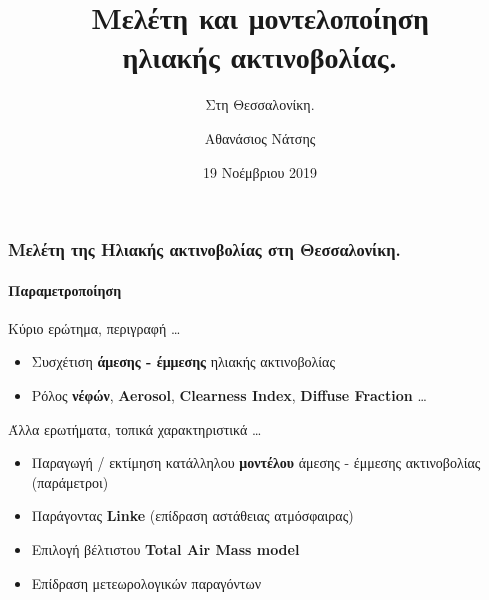 \documentclass[hyperref={pdfpagelabels=false}]{beamer}
\makeatletter
\newcommand\makebeamertitle{\frame{\maketitle}}%
\let\origtableofcontents=\tableofcontents
\def\tableofcontents{\@ifnextchar[{\origtableofcontents}{\gobbletableofcontents}}
\def\gobbletableofcontents#1{\origtableofcontents}
\def\myframeend{} %
\makeatother
\begin{document}


\title[Solar Iradiance]{Μελέτη και μοντελοποίηση\\ηλιακής ακτινοβολίας.}

\subtitle{Στη Θεσσαλονίκη.}
\author{Αθανάσιος Νάτσης}


\date[2019-11-19]{19 Νοέμβριου 2019}

\makebeamertitle

%

\begin{frame}%
\frametitle{Μελέτη της Ηλιακής ακτινοβολίας στη Θεσσαλονίκη.}
\framesubtitle{Παραμετροποίηση}

    \begin{exampleblock}{Κύριο ερώτημα, περιγραφή \ldots}
        \begin{itemize}
            \item Συσχέτιση \textbf{άμεσης - έμμεσης}  ηλιακής ακτινοβολίας
            \item Ρόλος \textbf{νέφών}, \textbf{Aerosol}, \textbf{Clearness Index}, \textbf{Diffuse Fraction} \ldots
        \end{itemize}
    \end{exampleblock}
\pause
    \begin{exampleblock}{Άλλα ερωτήματα, τοπικά χαρακτηριστικά \ldots}
        \begin{itemize}
            \item Παραγωγή / εκτίμηση κατάλληλου \textbf{μοντέλου} άμεσης - έμμεσης ακτινοβολίας (παράμετροι)
            \item Παράγοντας \textbf{Linke} (επίδραση αστάθειας ατμόσφαιρας)
            \item Επιλογή βέλτιστου \textbf{Total Air Μass model}
            \item Επίδραση μετεωρολογικών παραγόντων
        \end{itemize}
    \end{exampleblock}

\end{frame}    
\end{document}
